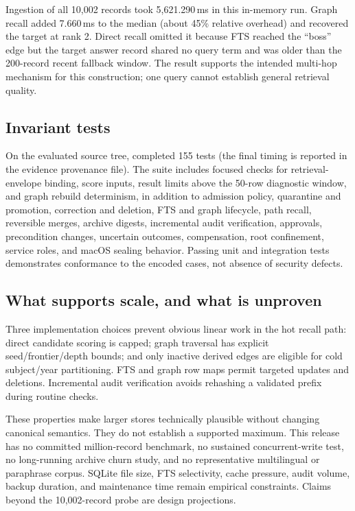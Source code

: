 Ingestion of all 10,002 records took 5,621.290\,ms in this in-memory run. Graph recall added 7.660\,ms to the median (about 45\% relative overhead) and recovered the target at rank 2. Direct recall omitted it because FTS reached the ``boss'' edge but the target answer record shared no query term and was older than the 200-record recent fallback window. The result supports the intended multi-hop mechanism for this construction; one query cannot establish general retrieval quality.

\subsection{Invariant tests}

On the evaluated source tree,  completed 155 tests (the final timing is reported in the evidence provenance file). The suite includes focused checks for retrieval-envelope binding, score inputs, result limits above the 50-row diagnostic window, and graph rebuild determinism, in addition to admission policy, quarantine and promotion, correction and deletion, FTS and graph lifecycle, path recall, reversible merges, archive digests, incremental audit verification, approvals, precondition changes, uncertain outcomes, compensation, root confinement, service roles, and macOS sealing behavior. Passing unit and integration tests demonstrates conformance to the encoded cases, not absence of security defects.

\subsection{What supports scale, and what is unproven}

Three implementation choices prevent obvious linear work in the hot recall path: direct candidate scoring is capped; graph traversal has explicit seed/frontier/depth bounds; and only inactive derived edges are eligible for cold subject/year partitioning. FTS and graph row maps permit targeted updates and deletions. Incremental audit verification avoids rehashing a validated prefix during routine checks.

These properties make larger stores technically plausible without changing canonical semantics. They do not establish a supported maximum. This release has no committed million-record benchmark, no sustained concurrent-write test, no long-running archive churn study, and no representative multilingual or paraphrase corpus. SQLite file size, FTS selectivity, cache pressure, audit volume, backup duration, and maintenance time remain empirical constraints. Claims beyond the 10,002-record probe are design projections.

